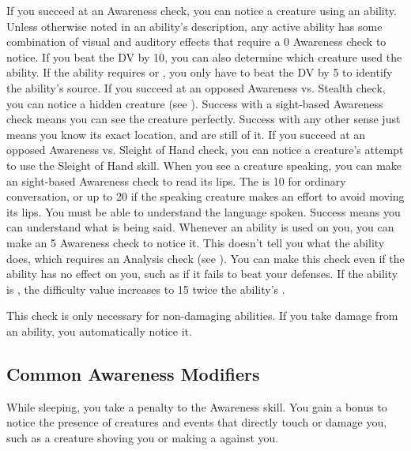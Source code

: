      If you succeed at an Awareness check, you can notice a creature using an ability.
    Unless otherwise noted in an ability's description, any active ability has some combination of visual and auditory effects that require a  0 Awareness check to notice.
    If you beat the DV by 10, you can also determine which creature used the ability.
    If the ability requires  or , you only have to beat the DV by 5 to identify the ability's source.
     If you succeed at an opposed Awareness vs. Stealth check, you can notice a hidden creature (see ).
    Success with a sight-based Awareness check means you can see the creature perfectly.
    Success with any other sense just means you know its exact location, and are still \partiallyunaware of it.
     If you succeed at an opposed Awareness vs. Sleight of Hand check, you can notice a creature's attempt to use the Sleight of Hand skill.
     When you see a creature speaking, you can make an sight-based Awareness check to read its lips.
    The  is 10 for ordinary conversation, or up to 20 if the speaking creature makes an effort to avoid moving its lips.
    You must be able to understand the language spoken.
    Success means you can understand what is being said.
     Whenever an ability is used on you, you can make an  5 Awareness check to notice it.
    This doesn't tell you what the ability does, which requires an Analysis check (see ).
    You can make this check even if the ability has no effect on you, such as if it fails to beat your defenses.
    If the ability is \atSubtle, the difficulty value increases to 15 \add twice the ability's .
    
    This check is only necessary for non-damaging abilities.
    If you take damage from an ability, you automatically notice it.

  \subsection{Common Awareness Modifiers}\label{Common Awareness Modifiers}
    While sleeping, you take a  penalty to the Awareness skill.
    You gain a  bonus to notice the presence of creatures and events that directly touch or damage you, such as a creature shoving you or making a  against you.

